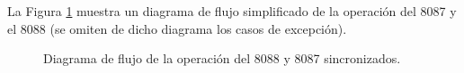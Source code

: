 La Figura \ref{fig:flujo1} muestra un diagrama de flujo simplificado de 
la operaci\'on del 8087 y el 8088 (se omiten de dicho diagrama los casos de excepci\'on). 

\begin{figure}[!hbt]
\vskip 20mm
\vskip 180mm
\caption{Diagrama de flujo de la operaci\'on del 8088 y 8087 sincronizados.}
\label{fig:flujo1}
\end{figure}

